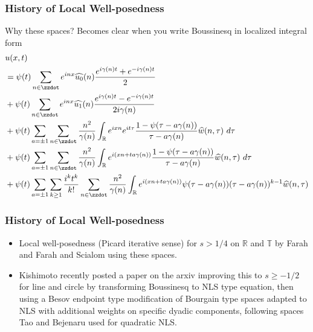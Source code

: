 \documentclass{beamer}
\numberwithin{equation*}{section}
\newcommand{\rr}{\mathbb{R}}
\newcommand{\ci}{\mathbb{T}}
\newcommand{\wh}{\widehat}
\begin{document}
\begin{frame}
\frametitle{History of Local Well-posedness}
Why these spaces? Becomes clear when you write Boussinesq in localized integral form
\begin{align*}
& u(x,t)
\label{main1-rel-term-0}
\\
\label{main1-rel-term-1}
& = \psi(t) \sum_{n \in \zzdot} e^{inx} \wh{u_{0}}(n) \frac{e^{i\gamma(n)t} + e^{-i\gamma(n)t}}{2} 
\\
\label{main1-rel-term-2}
& + \psi(t) \sum_{n \in \zzdot} e^{inx}
\wh{u_{1}}(n)\frac{e^{i\gamma(n)t} - e^{-i\gamma(n)t}}{2 i \gamma(n)} 
\\
\label{main1-rel-term-3}
& +  \psi(t)\sum_{a = \pm 1} \sum_{n \in \zzdot} \frac{n^{2}}{\gamma(n)}\int_\rr e^{ixn}  
e^{it \tau} \frac{1 - \psi(\tau -  a\gamma(n)) 
}{\tau -  a\gamma(n)} \wh{w}(n, \tau) \ d \tau
\\
\label{main1-rel-term-4}
& + \psi(t) \sum_{a = \pm 1} \sum_{n \in \zzdot} \frac{n^{2}}{\gamma(n)}\int_\rr e^{i(xn + 
t a\gamma(n))}
\frac{1- \psi(\tau -  a\gamma(n))}{\tau -  a\gamma(n)} \wh{w}(n, \tau) \ d \tau
\\
\label{main1-rel-term-4.5}
& +  \psi(t) \sum_{a = \pm 1}  \sum_{k \ge 1} \frac{i^k t^k}{k!}
\sum_{n \in \zzdot} \frac{n^{2}}{\gamma(n)}\int_\rr e^{i(xn + t a\gamma(n) )}
\psi(\tau -  a\gamma(n)) (\tau -  a\gamma(n))^{k-1} \wh{w}(n, \tau)
\end{align*}
\end{frame}
\begin{frame}
\frametitle{History of Local Well-posedness}
\begin{itemize}
\item{}Local well-posedness (Picard iterative sense) for $s > 1/4$ on $\rr$ and $\ci$ by Farah and Farah and Scialom using these spaces.
\pause
\item{} Kishimoto recently posted a paper on the arxiv improving this to $s \ge -1/2$ for line and circle by transforming Boussinesq to NLS type equation, then using a Besov endpoint type modification of Bourgain type spaces adapted to NLS with additional weights on specific dyadic components, following spaces Tao and Bejenaru used for quadratic NLS.
\end{itemize}
\end{frame}
\end{document}
